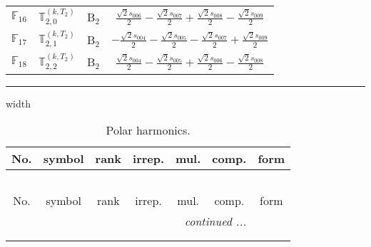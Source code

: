 \documentclass[fleqn,10pt,landscape]{article}
\begin{document}
\begin{itemize}
\begin{center}
\begin{longtable}{c|c|c|c}
$ \mathbb{F}_{16} $ & $\mathbb{T}_{2,0}^{(k,T_{2})}$ & B$_{2}$ & $\frac{\sqrt{2} s_{006}}{2} - \frac{\sqrt{2} s_{007}}{2} + \frac{\sqrt{2} s_{008}}{2} - \frac{\sqrt{2} s_{009}}{2}$ \\
$ \mathbb{F}_{17} $ & $\mathbb{T}_{2,1}^{(k,T_{2})}$ & B$_{2}$ & $- \frac{\sqrt{2} s_{004}}{2} - \frac{\sqrt{2} s_{005}}{2} - \frac{\sqrt{2} s_{007}}{2} + \frac{\sqrt{2} s_{009}}{2}$ \\
$ \mathbb{F}_{18} $ & $\mathbb{T}_{2,2}^{(k,T_{2})}$ & B$_{2}$ & $\frac{\sqrt{2} s_{004}}{2} - \frac{\sqrt{2} s_{005}}{2} + \frac{\sqrt{2} s_{006}}{2} - \frac{\sqrt{2} s_{008}}{2}$ \\
\end{longtable}
\end{center}

 \hfil \hrule height 1mm width \textwidth \hfil

\begin{center}
\renewcommand{\arraystretch}{1.3}
\begin{longtable}{ccccccc}
\caption{Polar harmonics.}
 \\
 \hline \hline
No. & symbol & rank & irrep. & mul. & comp. & form \\ \hline \endfirsthead

\multicolumn{6}{l}{\tablename\ \thetable{}} \\
 \hline \hline
No. & symbol & rank & irrep. & mul. & comp. & form \\ \hline \endhead

 \hline \hline
\multicolumn{6}{r}{\footnotesize\it continued ...} \\ \endfoot

 \hline \hline
\multicolumn{6}{r}{} \\ \endlastfoot


\end{longtable}
\end{center}
\end{itemize}
\end{document}
